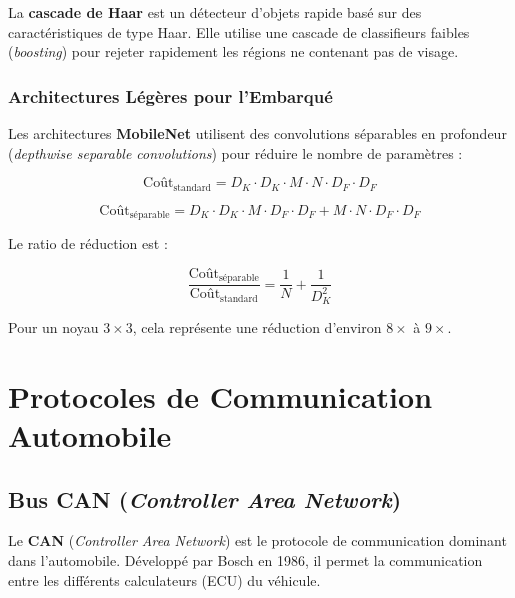 \documentclass[12pt,a4paper,twoside]{report}
\newcommand{\keyword}[1]{\textbf{\textcolor{stellantisblue}{#1}}}
\begin{document}
La \keyword{cascade de Haar} \cite{viola2001} est un détecteur d'objets rapide basé sur des caractéristiques de type Haar. Elle utilise une cascade de classifieurs faibles (\textit{boosting}) pour rejeter rapidement les régions ne contenant pas de visage.

\subsubsection{Architectures Légères pour l'Embarqué}

Les architectures \keyword{MobileNet} \cite{howard2017, sandler2018} utilisent des convolutions séparables en profondeur (\textit{depthwise separable convolutions}) pour réduire le nombre de paramètres :

\begin{equation}
\text{Coût}_{\text{standard}} = D_K \cdot D_K \cdot M \cdot N \cdot D_F \cdot D_F
\label{eq:standard_conv_cost}
\end{equation}

\begin{equation}
\text{Coût}_{\text{séparable}} = D_K \cdot D_K \cdot M \cdot D_F \cdot D_F + M \cdot N \cdot D_F \cdot D_F
\label{eq:separable_conv_cost}
\end{equation}

Le ratio de réduction est :

\begin{equation}
\frac{\text{Coût}_{\text{séparable}}}{\text{Coût}_{\text{standard}}} = \frac{1}{N} + \frac{1}{D_K^2}
\label{eq:cost_ratio}
\end{equation}

Pour un noyau $3 \times 3$, cela représente une réduction d'environ $8 \times$ à $9 \times$.

\section{Protocoles de Communication Automobile}

\subsection{Bus CAN (\textit{Controller Area Network})}

Le \keyword{CAN} (\textit{Controller Area Network}) \cite{can2003} est le protocole de communication dominant dans l'automobile. Développé par Bosch en 1986, il permet la communication entre les différents calculateurs (ECU) du véhicule.
\end{document}
